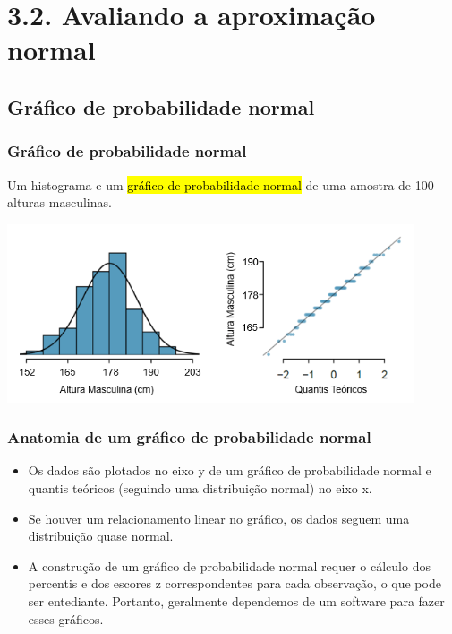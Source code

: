 
\section{3.2. Avaliando a aproximação normal}


\subsection{Gráfico de probabilidade normal}


\begin{frame}
\frametitle{Gráfico de probabilidade normal}
\justifying
Um histograma e um \hl {gráfico de probabilidade normal} de uma amostra de 100 alturas masculinas.

\begin{center}
\includegraphics[width=0.9\textwidth]{3-2_evaluating_normal_approx/fcidMHeights.png}
\end{center}

\end{frame}


\begin{frame}
\frametitle{Anatomia de um gráfico de probabilidade normal}

\begin{itemize}
\justifying
\item Os dados são plotados no eixo y de um gráfico de probabilidade normal e quantis teóricos (seguindo uma distribuição normal) no eixo x.
\justifying
\item Se houver um relacionamento linear no gráfico, os dados seguem uma distribuição quase normal.
\justifying
\item A construção de um gráfico de probabilidade normal requer o cálculo dos percentis e dos escores z correspondentes para cada observação, o que pode ser entediante. Portanto, geralmente dependemos de um software para fazer esses gráficos.

\end{itemize}

\end{frame}

